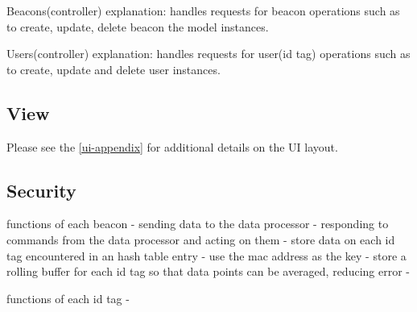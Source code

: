 Beacons(controller)
	explanation: handles requests for beacon operations such as to create, update, delete beacon the model instances.

Users(controller)
	explanation: handles requests for user(id tag) operations such as to create, update and delete user instances.

\subsection{View}
Please see the \ref{ui-appendix} for additional details on the UI layout.


\subsection{Security}


\bigskip

functions of each beacon
	- sending data to the data processor
	- responding to commands from the data processor and acting on them
	- store data on each id tag encountered in an hash table entry - use the mac address as the key
	- store a rolling buffer for each id tag so that data points can be averaged, reducing error
	-

\bigskip

functions of each id tag
	-




